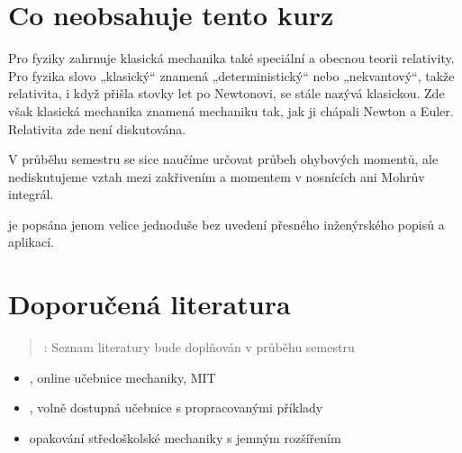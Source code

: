 \documentclass[letterpaper,10pt,english]{jupyterBook}
\begin{document}
\chapter{Co neobsahuje tento kurz}
\label{\detokenize{Prednasky/0_1_Definice_a_historie_mechaniky:co-neobsahuje-tento-kurz}}
\sphinxAtStartPar
{} Pro fyziky zahrnuje klasická mechanika také speciální a obecnou teorii relativity. Pro fyzika slovo „klasický“ znamená „deterministický“ nebo „nekvantový“, takže relativita, i když přišla stovky let po Newtonovi, se stále nazývá klasickou. Zde však klasická mechanika znamená mechaniku tak, jak ji chápali Newton a Euler. Relativita zde není diskutována.

\sphinxAtStartPar
{} V průběhu semestru se sice naučíme určovat průbeh ohybových momentů, ale nediskutujeme vztah mezi zakřivením a momentem v nosnících ani Mohrův integrál.

\sphinxAtStartPar
{} je popsána jenom velice jednoduše bez uvedení přesného inženýrského popisů a aplikací.


\chapter{Doporučená literatura}
\label{\detokenize{Prednasky/0_1_Definice_a_historie_mechaniky:doporucena-literatura}}\begin{quote}

\sphinxAtStartPar
{}: Seznam literatury bude doplňován v průběhu semestru
\end{quote}
\begin{itemize}
\item {} 
\sphinxAtStartPar
{}, online učebnice mechaniky, MIT

\item {} 
\sphinxAtStartPar
{}, volně dostupná učebnice s propracovanými příklady

\item {} 
\sphinxAtStartPar
{} opakování středoškolské mechaniky s jemným rozšířením

\end{itemize}
\end{document}
